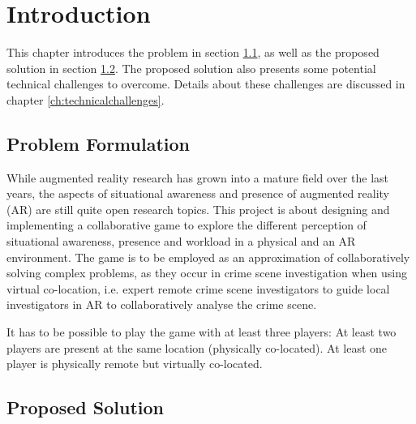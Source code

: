 \chapter{Introduction} \label{ch:introduction}
	This chapter introduces the problem in section \ref{sec:problem}, as well as
	the proposed solution in section \ref{sec:solution}. The proposed solution
	also presents some potential technical challenges to overcome. Details about 
	these challenges are discussed in chapter \ref{ch:technicalchallenges}.

	\section{Problem Formulation} \label{sec:problem}
		While augmented reality research has grown into a mature field over the 
		last years, the aspects of situational awareness and presence of 
		augmented reality (AR) are still quite open research topics. This 
		project is about designing and implementing a collaborative game to 
		explore the different perception of situational awareness, presence and 
		workload in a physical and an AR environment. The game is to be employed 
		as an approximation of collaboratively solving complex problems, as they 
		occur in crime scene investigation when using virtual co-location, i.e. 
		expert remote crime scene investigators to guide local investigators in 
		AR to collaboratively analyse the crime scene.
		
		It has to be possible to play the game with at least three players: At 
		least two players are present at the same location (physically 
		co-located). At least one player is physically remote but virtually 
		co-located. \cite{bepsys}
	
	\section{Proposed Solution} \label{sec:solution}
		
